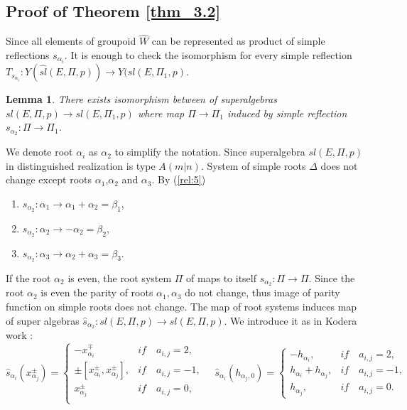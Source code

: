 \documentclass[english]{elsarticle}
\newtheorem{lemma}{Lemma}[section]
\numberwithin{equation}{section}
\begin{document}
\subsection{Proof of Theorem \ref{thm_3.2}}

Since all elements of groupoid $\hat{W}$ can be represented as product of simple reflections $s_{\alpha_i}$. It is enough to check the isomorphism for every simple reflection $T_{s_{\alpha_i}}:Y(\hat{sl}(E,\Pi,p))\rightarrow Y(\hat{sl}(E,\Pi_1,p)$.
\begin{lemma}
\label{lem:9}
There exists isomorphism between of superalgebras $sl(E,\Pi,p)\rightarrow sl(E, \Pi_1, p)$ where map $\Pi\rightarrow \Pi_1$ induced by simple reflection $s_{\alpha_2}:\Pi\rightarrow \Pi_1$.\\
\end{lemma}
We denote root $\alpha_i$ as $\alpha_2$ to simplify the notation.
Since superalgebra $sl(E,\Pi,p)$ in distinguished realization is type $A(m|n)$. System of simple roots $\Delta$ does not change except roots $\alpha_1$,$\alpha_2$ and $\alpha_3$. By (\ref{rel:5})
\begin{enumerate}
    \item $s_{\alpha_2}:\alpha_1 \rightarrow \alpha_1+\alpha_2=\beta_1$,
    \item $s_{\alpha_2}:\alpha_2 \rightarrow -\alpha_2=\beta_2$,
    \item $s_{\alpha_2}:\alpha_3 \rightarrow \alpha_2+\alpha_3=\beta_3$.
\end{enumerate}

If the root $\alpha_2$ is even, the root system $\Pi$ of maps to itself $s_{\alpha_2}:\Pi \rightarrow \Pi$. Since the root $\alpha_2$ is even the parity of roots $\alpha_1,\alpha_3$ do not change, thus image of parity function on simple roots does not change. The map of root systems induces map of super algebras $\hat{s}_{\alpha_2}:sl(E,\Pi,p)\rightarrow sl(E, \Pi, p)$. We introduce it as in Kodera work \cite{Kodera}:
\[
\hat{s}_{\alpha_i}(x_{\alpha_j}^{\pm})=
\begin{cases}
         -x_{\alpha_i}^{\mp} & if \quad a_{i,j}=2,\\
        \pm[x_{\alpha_i}^{\pm},x_{\alpha_j}^{\pm}], & if \quad a_{i,j}=-1,\\
         x_{\alpha_j}^{\pm} & if \quad a_{i,j}=0,\\
\end{cases}
\quad
\hat{s}_{\alpha_i}(h_{\alpha_j,0})=
\begin{cases}
    -h_{\alpha_i}, & if \quad a_{i,j}=2,\\
    h_{\alpha_i}+h_{\alpha_j}, & if \quad a_{i,j}=-1, \\
    h_{\alpha_j}, & if \quad a_{i,j}=0.
\end{cases}
\]
\end{document}
